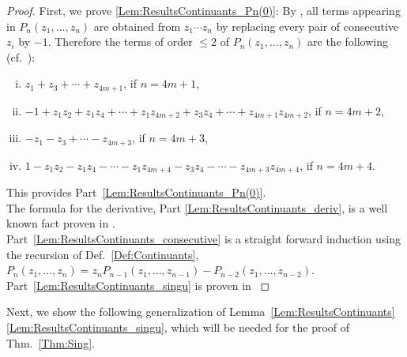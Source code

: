 \documentclass[letter,11pt]{amsart}
\theoremstyle{theorem}
\theoremstyle{definition}
\numberwithin{equation}{section}
\begin{document}
\begin{proof}
	First, we prove \eqref{Lem:ResultsContinuants_Pn(0)}:
	By \cite[Number~545]{Muir},
	all terms appearing in $ P_n(z_1, \ldots, z_n ) $ 
	are obtained from $ z_1 \cdots z_n $ by replacing every pair of
	consecutive $ z_i $ by $ -1 $. 
	Therefore the terms of order $ \leq 2 $ of $ P_n(z_1, \ldots, z_n ) $ are the following
	(cf.~\cite[Lemma~3.6]{BFMS25}):
	\begin{enumerate}[(i)]
		\item $ z_1 + z_3 + \cdots + z_{4m+1} $, \quad  if $ n = 4m+1 $,
		\item $ -1 + z_1 z_2  + z_1 z_4 + \cdots + z_1 z_{4m+2} + z_3 z_4 + \cdots + z_{4m+1} z_{4m+2} $, \quad  if $ n = 4m+2 $, 
		\item $ - z_1 - z_3 + \cdots - z_{4m+3} $, \quad  if $ n = 4m+3 $,
		\item $ 1 - z_1 z_2  - z_1 z_4 - \cdots - z_1 z_{4m+4} - z_3 z_4 - \cdots - z_{4m+3} z_{4m+4} $, \quad  if $ n = 4m+4 $. 
	\end{enumerate}	
	This provides Part~\eqref{Lem:ResultsContinuants_Pn(0)}.
	\\
	The formula for the derivative, Part \eqref{Lem:ResultsContinuants_deriv}, is a well known fact proven in \cite[Number 561 (4)]{Muir}.
	\\
	Part~\eqref{Lem:ResultsContinuants_consecutive} is a straight forward induction using the recursion of Def.~\ref{Def:Continuants},
	$ P_n (z_1, \ldots, z_n) = z_{n} P_{n-1} (z_1, \ldots, z_{n-1}) - P_{n-2} (z_1, \ldots, z_{n-2}) $.
	\\
	Part~\eqref{Lem:ResultsContinuants_singu} is proven in \cite[Lemma~3.7 and Prop.~3.8]{BFMS25}
\end{proof}

Next, we show the following generalization of Lemma~\ref{Lem:ResultsContinuants}\eqref{Lem:ResultsContinuants_singu}, 
which will be needed for the proof of Thm.~\ref{Thm:Sing}. 
\end{document}
